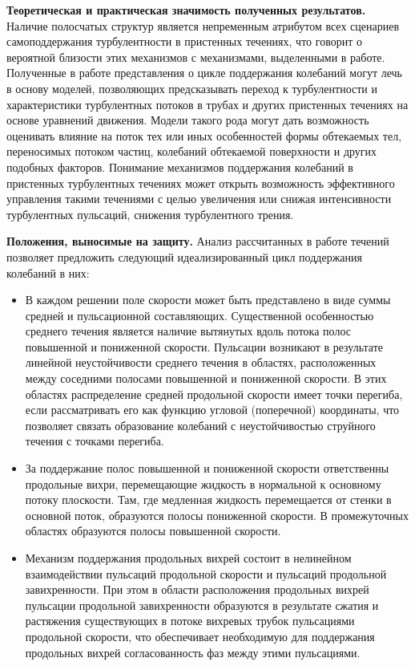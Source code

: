 {\bf Теоретическая и практическая значимость полученных результатов.}
Наличие полосчатых структур является непременным атрибутом всех сценариев самоподдержания турбулентности в пристенных течениях, что говорит о вероятной близости этих механизмов с механизмами, выделенными в работе. Полученные в работе представления о цикле поддержания колебаний могут лечь в основу моделей, позволяющих предсказывать переход к турбулентности и характеристики турбулентных потоков в трубах и других пристенных течениях на основе уравнений движения. Модели такого рода могут дать возможность оценивать влияние на поток тех или иных особенностей формы обтекаемых тел, переносимых потоком частиц, колебаний обтекаемой поверхности и других подобных факторов. Понимание механизмов поддержания колебаний в пристенных турбулентных течениях может открыть возможность эффективного управления такими течениями с целью увеличения или снижая интенсивности турбулентных пульсаций, снижения турбулентного трения.


{\bf Положения, выносимые на защиту.} Анализ рассчитанных в работе течений позволяет предложить следующий идеализированный цикл поддержания колебаний в них:
\begin{itemize}
\item В каждом решении поле скорости может быть представлено в виде суммы средней и пульсационной составляющих. Существенной особенностью среднего течения является наличие вытянутых вдоль потока полос повышенной и пониженной скорости. Пульсации возникают в результате линейной неустойчивости среднего течения в областях, расположенных между соседними полосами повышенной и пониженной скорости. В этих областях распределение средней продольной скорости имеет точки перегиба, если рассматривать его как функцию угловой (поперечной) координаты, что позволяет связать образование колебаний с неустойчивостью струйного течения с точками перегиба. 
\item За поддержание полос повышенной и пониженной скорости ответственны продольные вихри, перемещающие жидкость в нормальной к основному потоку плоскости. Там, где медленная жидкость перемещается от стенки в основной поток, образуются полосы пониженной скорости. В промежуточных областях образуются полосы повышенной скорости. 
\item Механизм поддержания продольных вихрей состоит в нелинейном взаимодействии пульсаций продольной скорости и пульсаций продольной завихренности. При этом в области расположения продольных вихрей пульсации продольной завихренности образуются в результате сжатия и растяжения существующих в потоке вихревых трубок пульсациями продольной скорости, что обеспечивает необходимую для поддержания продольных вихрей согласованность фаз между этими пульсациями. 
\end{itemize}

